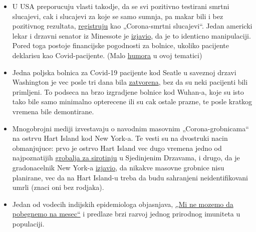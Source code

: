 \begin{itemize}
\tightlist
\item
  U USA preporucuju vlasti takodje, da se svi pozitivno testirani smrtni
  slucajevi, cak i slucajevi za koje se samo sumnja, pa makar bili i bez
  pozitivnog rezultata,
  \href{https://nypost.com/2020/04/07/feds-classify-all-coronavirus-patient-deaths-as-covid-19-deaths/?link=TD_mansionglobal_new_mansion_global.11147f181987fd93}{registruju}
  kao „Corona-smrtni slucajevi``. Jedan americki lekar i drzavni senator
  iz Minessote je
  \href{https://nypost.com/2020/04/07/feds-classify-all-coronavirus-patient-deaths-as-covid-19-deaths/?link=TD_mansionglobal_new_mansion_global.11147f181987fd93}{izjavio},
  da je to identicno manipulaciji. Pored toga postoje financijske
  pogodnosti za bolnice, ukoliko pacijente deklarisu kao
  Covid-pacijente. (Malo
  \href{https://swprs.files.wordpress.com/2020/04/cv-2019-2020.jpg}{humora}
  u ovoj tematici)
\item
  Jedna poljska bolnica za Covid-19 pacijente kod Seatle u saveznoj
  drzavi Washington je vec posle tri dana bila
  \href{https://www.yahoo.com/news/armys-seattle-field-hospital-closes-165646379.html}{zatvorena},
  bez da su neki pacijenti bili primljeni. To podseca na brzo izgradjene
  bolnice kod Wuhan-a, koje su isto tako bile samo minimalno opterecene
  ili su cak ostale prazne, te posle kratkog vremena bile demontirane.
\item
  Mnogobrojni mediji izvestavaju o navodnim masovnim
  „Corona-grobnicama`` na ostrvu Hart Island kod New York-a. Te vesti su
  na dvostruki nacin obmanjujuce: prvo je ostrvo Hart Island vec dugo
  vremena jedno od najpoznatijih
  \href{https://en.wikipedia.org/wiki/Hart_Island_(Bronx)\#Cemetery}{grobalja
  za sirotinju} u Sjedinjenim Drzavama, i drugo, da je gradonacelnik New
  York-a
  \href{https://www.independent.co.uk/news/world/americas/new-york-coronavirus-cases-burials-bodies-covid-19-hart-island-a9459956.html}{izjavio},
  da nikakve masovne grobnice nisu planirane, vec da na Hart Island-u
  treba da budu sahranjeni neidentifikovani umrli (znaci oni bez
  rodjaka).
\item
  Jedan od vodecih indijskih epidemiologa objasnjava,
  \href{https://www.business-standard.com/article/current-affairs/we-cannot-run-away-to-the-moon-need-to-develop-herd-immunity-dr-muliyil-120040601232_1.html}{„Mi
  ne mozemo da pobegnemo na mesec``} i predlaze brzi razvoj jednog
  prirodnog imuniteta u populaciji.
\end{itemize}

